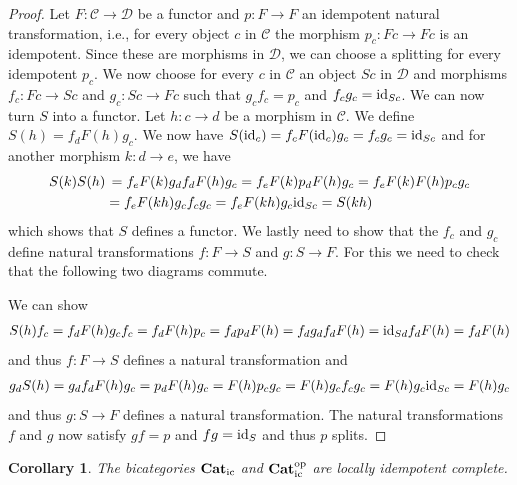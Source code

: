 \documentclass[12pt,oneside,reqno,a4paper]{article}
\newtheorem{corollary}[theorem]{Corollary}
\theoremstyle{definition}
\newcommand{\op}{^\textup{op}}
\newcommand{\Catic}{\textbf{\textup{Cat}}_\textup{ic}}
\newcommand{\id}{\textup{id}}
\newcommand{\C}{\mathcal{C}}
\newcommand{\D}{\mathcal{D}}
\begin{document}
\begin{proof}
Let $F:\C\to\D$ be a functor and $p:F\to F$ an idempotent natural transformation, i.e., for every object $c$ in $\C$ the morphism $p_c:Fc\to Fc$ is an idempotent. Since these are morphisms in $\D$, we can choose a splitting for every idempotent $p_c$. We now choose for every $c$ in $\C$ an object $Sc$ in $\D$ and morphisms $f_c:Fc\to Sc$ and $g_c:Sc\to Fc$ such that $g_c f_c=p_c$ and $f_c g_c=\id_{Sc}$. We can now turn $S$ into a functor. Let $h:c\to d$ be a morphism in $\C$. We define $S(h)=f_d F(h) g_c$. We now have $S(\id_c)=f_c F(\id_c) g_c=f_c g_c=\id_{Sc}$ and for another morphism $k:d\to e$, we have
\begin{align*}
S(k) S(h) & \, =f_e F(k) g_d f_d F(h) g_c=f_e F(k) p_d F(h) g_c=f_e F(k) F(h) p_c g_c \\
& = f_e F(kh) g_c f_c g_c= f_e F(kh) g_c \id_{Sc} = S(kh)
\end{align*}
which shows that $S$ defines a functor. We lastly need to show that the $f_c$ and $g_c$ define natural transformations $f:F\to S$ and $g:S \to F$. For this we need to check that the following two diagrams commute.
\begin{center}
\end{center}
We can show
\begin{align*}
S(h) f_c = f_d F(h) g_c f_c=f_d F(h) p_c = f_d p_d F(h) = f_d g_d f_d F(h)= \id_{Sd} f_d F(h) = f_d F(h) 
\end{align*}
and thus $f:F\to S$ defines a natural transformation and
\begin{align*}
g_d S(h) = g_d f_d F(h)g_c = p_d F(h) g_c = F(h) p_c g_c = F(h) g_c f_c g_c = F(h) g_c \id_{Sc} = F(h) g_c
\end{align*}
and thus $g:S\to F$ defines a natural transformation. The natural transformations $f$ and $g$ now satisfy $gf=p$ and $fg=\id_{S}$ and thus $p$ splits.
\end{proof}

\begin{corollary} \label{Catlic}
The bicategories $\Catic$ and $\Catic\op$ are locally idempotent complete.
\end{corollary}
\end{document}
